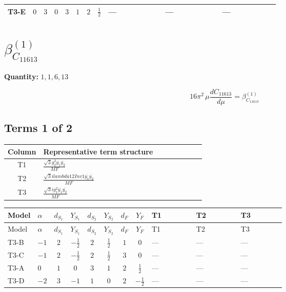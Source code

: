 \documentclass[8pt]{article}
\begin{document}
\begin{landscape}
\begin{longtable}{@{}llcccccc >{\raggedright\arraybackslash}p{0.21\linewidth} >{\raggedright\arraybackslash}p{0.21\linewidth} >{\raggedright\arraybackslash}p{0.21\linewidth}@{}}
\midrule
T3-E & $0$ & $3$ & $0$ & $3$ & $1$ & $2$ & $\frac{1}{2}$ & --- & --- & --- \\
\midrule
\bottomrule
\end{longtable}
\clearpage
\section*{$\beta_{C_{11613}}^{(1)}$}
\noindent\textbf{Quantity: }$\mathrm{1,1,6,13}$\par\smallskip
\[16\pi^2\,\mu\frac{d C_{11613}}{d\mu}=\beta_{C_{11613}}^{(1)}\]
\subsection*{Terms 1 of 2}
\begin{center}
\begin{tabular}{@{}c >{\raggedright\arraybackslash}p{0.82\linewidth}@{}}
\toprule
Column & Representative term structure \\
\midrule
T1 & \(\displaystyle \frac{\sqrt{3} g_{2}^{2} \overline{y_{1}} \overline{y_{2}}}{MF}\) \\
\midrule
T2 & \(\displaystyle \frac{\sqrt{3} i lambda12Inv1 \overline{y_{1}} \overline{y_{2}}}{MF}\) \\
\midrule
T3 & \(\displaystyle \frac{\sqrt{3} i g_{1}^{2} \overline{y_{1}} \overline{y_{2}}}{MF}\) \\
\midrule
\bottomrule
\end{tabular}
\end{center}
\smallskip
\tiny
\begin{longtable}{@{}llcccccc >{\raggedright\arraybackslash}p{0.21\linewidth} >{\raggedright\arraybackslash}p{0.21\linewidth} >{\raggedright\arraybackslash}p{0.21\linewidth}@{}}
\toprule
Model & $\alpha$ & $d_{S_1}$ & $Y_{S_1}$ & $d_{S_2}$ & $Y_{S_2}$ & $d_F$ & $Y_F$ & T1 & T2 & T3 \\
\midrule
\endfirsthead
\toprule
Model & $\alpha$ & $d_{S_1}$ & $Y_{S_1}$ & $d_{S_2}$ & $Y_{S_2}$ & $d_F$ & $Y_F$ & T1 & T2 & T3 \\
\midrule
\endhead
T3-B & $-1$ & $2$ & $-\frac{1}{2}$ & $2$ & $\frac{1}{2}$ & $1$ & $0$ & --- & --- & --- \\
\midrule
T3-C & $-1$ & $2$ & $-\frac{1}{2}$ & $2$ & $\frac{1}{2}$ & $3$ & $0$ & --- & --- & --- \\
\midrule
T3-A & $0$ & $1$ & $0$ & $3$ & $1$ & $2$ & $\frac{1}{2}$ & --- & --- & --- \\
\midrule
T3-D & $-2$ & $3$ & $-1$ & $1$ & $0$ & $2$ & $-\frac{1}{2}$ & --- & --- & --- \\

\end{longtable}
\end{landscape}
\end{document}
